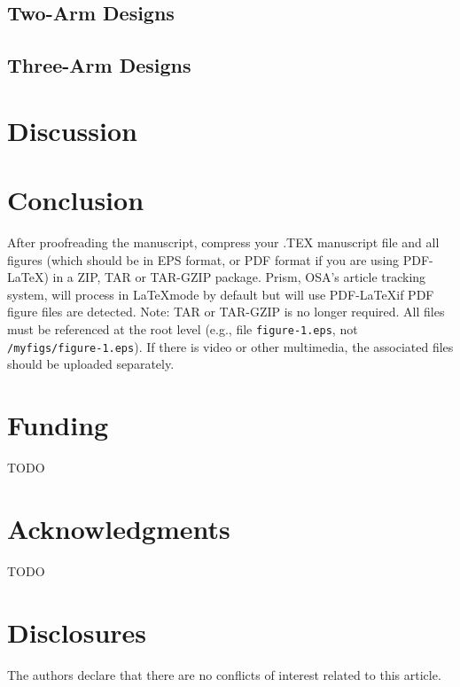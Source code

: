 \documentclass[10pt]{article}
\begin{document}
\subsection{Two-Arm Designs}
\subsection{Three-Arm Designs}

\section{Discussion}

\section{Conclusion}
After proofreading the manuscript, compress your .TEX manuscript file and all
figures (which should be in EPS format, or PDF format if you are using
PDF-\LaTeX) in a ZIP, TAR or TAR-GZIP package. Prism, OSA's article tracking
system, will process in \LaTeX mode by default but will use PDF-\LaTeX if PDF
figure files are detected. Note: TAR or TAR-GZIP is no longer required. All
files must be referenced at the root level (e.g., file \texttt{figure-1.eps},
not \texttt{/myfigs/figure-1.eps}). If there is video or other multimedia, the
associated files should be uploaded separately.

\section*{Funding}
TODO

\section*{Acknowledgments}
TODO

\section*{Disclosures}
The authors declare that there are no conflicts of interest related to this article.
\end{document}
